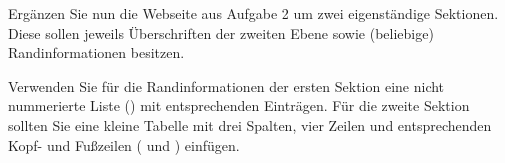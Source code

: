 %
\par Ergänzen Sie nun die Webseite aus Aufgabe 2 um zwei eigenständige Sektionen. Diese sollen jeweils Überschriften der zweiten Ebene sowie (beliebige) Randinformationen besitzen.
%
\par Verwenden Sie für die Randinformationen der ersten Sektion eine nicht nummerierte Liste () mit entsprechenden Einträgen. Für die zweite Sektion sollten Sie eine kleine Tabelle mit drei Spalten, vier Zeilen und entsprechenden Kopf- und Fußzeilen ( und ) einfügen.